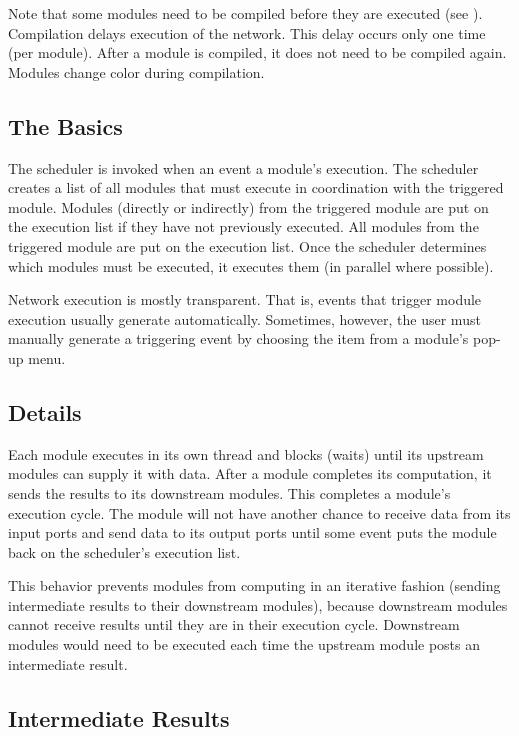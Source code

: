 Note that some modules need to be compiled before they are
executed (see ).  Compilation
delays execution of the network.  This delay occurs only one time
(per module).  After a module is compiled, it does not need to be
compiled again.  Modules change color during compilation.

\subsection{The Basics}

The scheduler is invoked when an event  a
module's execution.  The scheduler creates a list of all modules that
must execute in coordination with the triggered module. Modules
 (directly or indirectly) from the triggered module are 
put on the execution list if they have not previously executed.
All modules  from the triggered module are put
on the execution list.  Once the scheduler determines which modules must be
executed, it executes them (in parallel where possible).

Network execution is mostly transparent.  That is, events that trigger
module execution usually generate automatically. Sometimes,
however, the user must manually
generate a triggering event by choosing the  item from a
module's pop-up menu.

\subsection{Details}

Each module executes in its own thread and blocks (waits) until its upstream
modules can supply it with data.  After a module completes its computation,
it sends the results to its downstream modules.  This completes a module's
execution cycle.  The module will not have another chance to receive data from its input ports
and send data to its output ports until some event
puts the  module back on the scheduler's execution list.  

This behavior prevents modules from computing in an iterative fashion 
(sending intermediate results to their downstream modules), because
downstream modules cannot receive results until they are in their
execution cycle. Downstream modules would need to be executed each time the
upstream module posts an intermediate result.


\subsection{Intermediate Results}

